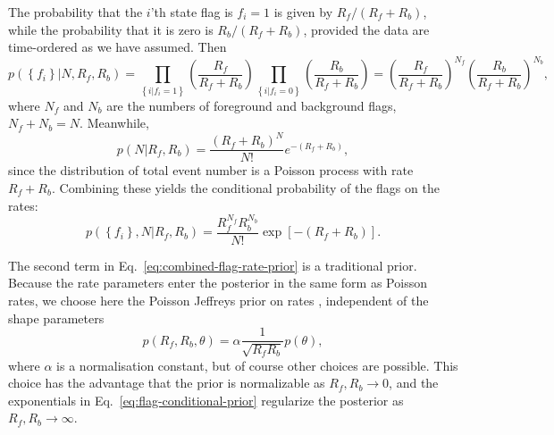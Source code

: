 \documentclass[aps,prd]{revtex4-1}
\newcommand{\mathset}[1]{\left\{ #1 \right\}}
\begin{document}
The probability that the $i$'th state flag is $f_i=1$ is given by
$R_f/(R_f+R_b)$, while the probability that it is zero is
$R_b/(R_f+R_b)$, provided the data are time-ordered as we have
assumed.  Then
\begin{equation}
p\left( \mathset{f_i} | N, R_f, R_b\right) = \prod_{\mathset{i|f_i=1}}
\left(\frac{R_f}{R_f+R_b}\right) \prod_{\mathset{i|f_i=0}}
\left(\frac{R_b}{R_f+R_b}\right) =
\left(\frac{R_f}{R_f+R_b}\right)^{N_f}
\left(\frac{R_b}{R_f+R_b}\right)^{N_b},
\end{equation}
where $N_f$ and $N_b$ are the numbers of foreground and background
flags, $N_f+N_b=N$.  Meanwhile,
\begin{equation}
p\left(N |R_f, R_b\right) = \frac{\left(R_f+R_b\right)^N}{N!}
e^{-(R_f+R_b)},
\end{equation}
since the distribution of total event number is a Poisson process with
rate $R_f+R_b$.  Combining these yields the conditional probability of
the flags on the rates:
\begin{equation}
  \label{eq:flag-conditional-prior}
  p\left(\mathset{f_i},N | R_f, R_b\right) = \frac{R_f^{N_f}
    R_b^{N_b}}{N!} \exp\left[ - \left(R_f + R_b\right) \right].
\end{equation} 


The second term in Eq.~\eqref{eq:combined-flag-rate-prior} is a
traditional prior.  Because the rate parameters enter the posterior in
the same form as Poisson rates, we choose here the Poisson Jeffreys
prior on rates \citep{Jeffreys1946}, independent of the shape
parameters
\begin{equation}
  p\left( R_f, R_b, \theta\right) = \alpha \frac{1}{\sqrt{R_f R_b}}
  p(\theta),
\end{equation}
where $\alpha$ is a normalisation constant, but of course other
choices are possible.  This choice has the advantage that the prior is
normalizable as $R_f, R_b \to 0$, and the exponentials in
Eq.~\eqref{eq:flag-conditional-prior} regularize the posterior as
$R_f, R_b \to \infty$.
\end{document}
